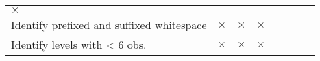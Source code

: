 \documentclass[]{article}
\begin{document}
\begin{longtable}[]{@{}lccccccc@{}}
\begin{minipage}[t]{0.06\columnwidth}
\(\times\)\strut
\end{minipage}\tabularnewline
\begin{minipage}[t]{0.33\columnwidth}\raggedright
Identify prefixed and suffixed whitespace\strut
\end{minipage} & \begin{minipage}[t]{0.07\columnwidth}\centering
\(\times\)\strut
\end{minipage} & \begin{minipage}[t]{0.07\columnwidth}\centering
\(\times\)\strut
\end{minipage} & \begin{minipage}[t]{0.07\columnwidth}\centering
\(\times\)\strut
\end{minipage} & \begin{minipage}[t]{0.07\columnwidth}\centering
\strut
\end{minipage} & \begin{minipage}[t]{0.07\columnwidth}\centering
\strut
\end{minipage} & \begin{minipage}[t]{0.06\columnwidth}\centering
\strut
\end{minipage} & \begin{minipage}[t]{0.06\columnwidth}\centering
\strut
\end{minipage}\tabularnewline
\begin{minipage}[t]{0.33\columnwidth}\raggedright
Identify levels with \textless{} 6 obs.\strut
\end{minipage} & \begin{minipage}[t]{0.07\columnwidth}\centering
\(\times\)\strut
\end{minipage} & \begin{minipage}[t]{0.07\columnwidth}\centering
\(\times\)\strut
\end{minipage} & \begin{minipage}[t]{0.07\columnwidth}\centering
\(\times\)\strut
\end{minipage} & \begin{minipage}[t]{0.07\columnwidth}\centering
\strut
\end{minipage} & \begin{minipage}[t]{0.07\columnwidth}\centering
\strut
\end{minipage} & \begin{minipage}[t]{0.06\columnwidth}\centering
\strut
\end{minipage} & \begin{minipage}[t]{0.06\columnwidth}\centering

\end{minipage}
\end{longtable}
\end{document}

